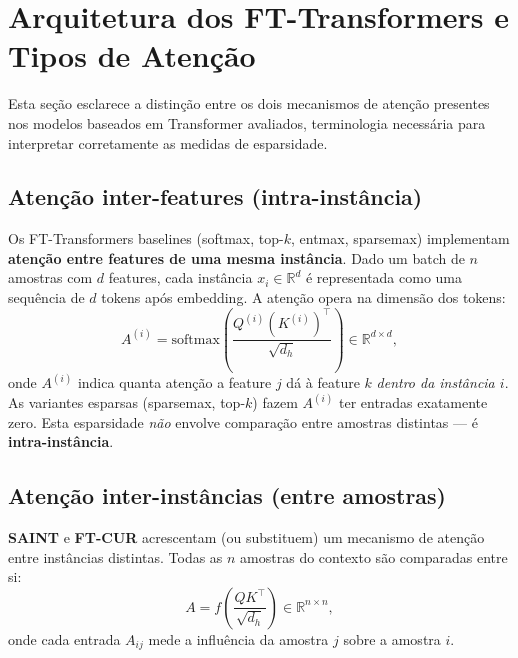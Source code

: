 \documentclass[12pt,a4paper]{article}
\begin{document}
\section{Arquitetura dos FT-Transformers e Tipos de Atenção}
\label{sec:ft_attention}

Esta seção esclarece a distinção entre os dois mecanismos de atenção presentes
nos modelos baseados em Transformer avaliados, terminologia necessária para
interpretar corretamente as medidas de esparsidade.

\subsection{Atenção inter-features (intra-instância)}

Os FT-Transformers baselines (softmax, top-$k$, entmax, sparsemax) implementam
\textbf{atenção entre features de uma mesma instância}. Dado um batch de $n$
amostras com $d$ features, cada instância $x_i \in \mathbb{R}^d$ é representada
como uma sequência de $d$ tokens após embedding. A atenção opera na dimensão
dos tokens:
\[
  A^{(i)} = \text{softmax}\!\left(\frac{Q^{(i)} (K^{(i)})^\top}{\sqrt{d_h}}\right)
  \in \mathbb{R}^{d \times d},
\]
onde $A^{(i)}$ indica quanta atenção a feature $j$ dá à feature $k$ \emph{dentro
da instância $i$}. As variantes espar\-sas (sparsemax, top-$k$) fazem $A^{(i)}$
ter entradas exatamente zero. Esta esparsidade \emph{não} envolve comparação
entre amostras distintas --- é \textbf{intra-instância}.

\subsection{Atenção inter-instâncias (entre amostras)}

\textbf{SAINT} e \textbf{FT-CUR} acrescentam (ou substituem) um mecanismo de
atenção entre instâncias distintas. Todas as $n$ amostras do contexto são
comparadas entre si:
\[
  A = f\!\left(\frac{Q K^\top}{\sqrt{d_h}}\right) \in \mathbb{R}^{n \times n},
\]
onde cada entrada $A_{ij}$ mede a influência da amostra $j$ sobre a amostra $i$.
\end{document}
